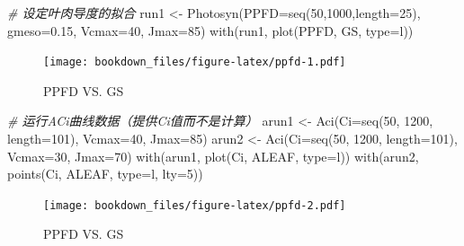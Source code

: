 \documentclass[
]{krantz}
\makeatletter
\newenvironment{Shaded}{\begin{snugshade}}{\end{snugshade}}
\newcommand{\AttributeTok}[1]{\textcolor[rgb]{0.77,0.63,0.00}{#1}}
\newcommand{\CommentTok}[1]{\textcolor[rgb]{0.56,0.35,0.01}{\textit{#1}}}
\newcommand{\DecValTok}[1]{\textcolor[rgb]{0.00,0.00,0.81}{#1}}
\newcommand{\FloatTok}[1]{\textcolor[rgb]{0.00,0.00,0.81}{#1}}
\newcommand{\FunctionTok}[1]{\textcolor[rgb]{0.00,0.00,0.00}{#1}}
\newcommand{\NormalTok}[1]{#1}
\newcommand{\OtherTok}[1]{\textcolor[rgb]{0.56,0.35,0.01}{#1}}
\newcommand{\StringTok}[1]{\textcolor[rgb]{0.31,0.60,0.02}{#1}}
\newenvironment{kframe}{%
\medskip{}
\setlength{\fboxsep}{.8em}
 \def\at@end@of@kframe{}%
 \ifinner\ifhmode%
  \def\at@end@of@kframe{\end{minipage}}%
  \begin{minipage}{\columnwidth}%
 \fi\fi%
 \def\FrameCommand##1{\hskip\@totalleftmargin \hskip-\fboxsep
 \colorbox{shadecolor}{##1}\hskip-\fboxsep
     \hskip-\linewidth \hskip-\@totalleftmargin \hskip\columnwidth}%
 \MakeFramed {\advance\hsize-\width
   \@totalleftmargin\z@ \linewidth\hsize
   \@setminipage}}%
 {\par\unskip\endMakeFramed%
 \at@end@of@kframe}
\renewenvironment{Shaded}{\begin{kframe}}{\end{kframe}}
\makeatother
\begin{document}
\begin{Shaded}
\begin{Highlighting}[]
\CommentTok{\# 设定叶肉导度的拟合}
\NormalTok{run1 }\OtherTok{\textless{}{-}} \FunctionTok{Photosyn}\NormalTok{(}\AttributeTok{PPFD=}\FunctionTok{seq}\NormalTok{(}\DecValTok{50}\NormalTok{,}\DecValTok{1000}\NormalTok{,}\AttributeTok{length=}\DecValTok{25}\NormalTok{), }
                 \AttributeTok{gmeso=}\FloatTok{0.15}\NormalTok{, }\AttributeTok{Vcmax=}\DecValTok{40}\NormalTok{, }\AttributeTok{Jmax=}\DecValTok{85}\NormalTok{)}
\FunctionTok{with}\NormalTok{(run1, }\FunctionTok{plot}\NormalTok{(PPFD, GS, }\AttributeTok{type=}\StringTok{\textquotesingle{}l\textquotesingle{}}\NormalTok{))}
\end{Highlighting}
\end{Shaded}

\begin{figure}
\centering
\texttt{[image: bookdown\_files/figure-latex/ppfd-1.pdf]}
\caption{\label{fig:ppfd-1}PPFD VS. GS}
\end{figure}

\begin{Shaded}
\begin{Highlighting}[]
\CommentTok{\# 运行ACi曲线数据（提供Ci值而不是计算）}
\NormalTok{arun1 }\OtherTok{\textless{}{-}} \FunctionTok{Aci}\NormalTok{(}\AttributeTok{Ci=}\FunctionTok{seq}\NormalTok{(}\DecValTok{50}\NormalTok{, }\DecValTok{1200}\NormalTok{, }\AttributeTok{length=}\DecValTok{101}\NormalTok{), }
             \AttributeTok{Vcmax=}\DecValTok{40}\NormalTok{, }\AttributeTok{Jmax=}\DecValTok{85}\NormalTok{)}
\NormalTok{arun2 }\OtherTok{\textless{}{-}} \FunctionTok{Aci}\NormalTok{(}\AttributeTok{Ci=}\FunctionTok{seq}\NormalTok{(}\DecValTok{50}\NormalTok{, }\DecValTok{1200}\NormalTok{, }\AttributeTok{length=}\DecValTok{101}\NormalTok{), }
             \AttributeTok{Vcmax=}\DecValTok{30}\NormalTok{, }\AttributeTok{Jmax=}\DecValTok{70}\NormalTok{)}
\FunctionTok{with}\NormalTok{(arun1, }\FunctionTok{plot}\NormalTok{(Ci, ALEAF, }\AttributeTok{type=}\StringTok{\textquotesingle{}l\textquotesingle{}}\NormalTok{))}
\FunctionTok{with}\NormalTok{(arun2, }\FunctionTok{points}\NormalTok{(Ci, ALEAF, }\AttributeTok{type=}\StringTok{\textquotesingle{}l\textquotesingle{}}\NormalTok{, }\AttributeTok{lty=}\DecValTok{5}\NormalTok{))}
\end{Highlighting}
\end{Shaded}

\begin{figure}
\centering
\texttt{[image: bookdown\_files/figure-latex/ppfd-2.pdf]}
\caption{\label{fig:ppfd-2}PPFD VS. GS}
\end{figure}
\end{document}
